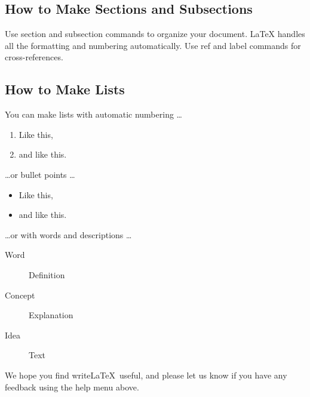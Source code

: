 \documentclass[a4paper]{article}
\begin{document}
\subsection{How to Make Sections and Subsections}

Use section and subsection commands to organize your document. \LaTeX{} handles all the formatting and numbering automatically. Use ref and label commands for cross-references.

\subsection{How to Make Lists}

You can make lists with automatic numbering \dots

\begin{enumerate}
\item Like this,
\item and like this.
\end{enumerate}
\dots or bullet points \dots
\begin{itemize}
\item Like this,
\item and like this.
\end{itemize}
\dots or with words and descriptions \dots
\begin{description}
\item[Word] Definition
\item[Concept] Explanation
\item[Idea] Text
\end{description}

We hope you find write\LaTeX\ useful, and please let us know if you have any feedback using the help menu above.
\end{document}

